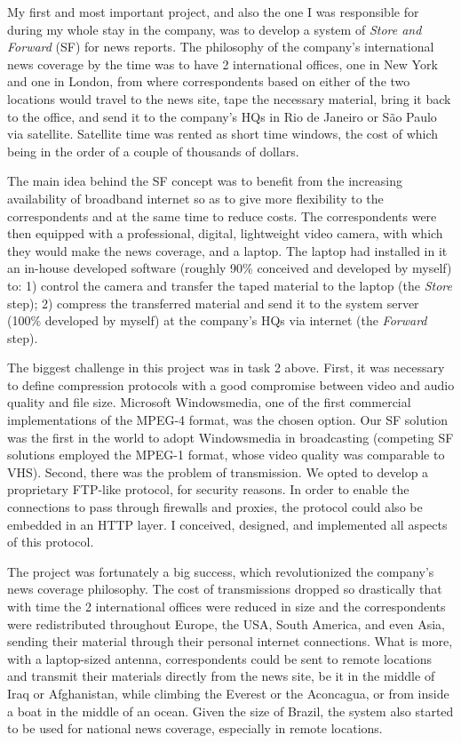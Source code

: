 \documentclass[a4paper]{article}
\begin{document}
My first and most important project, and also the one I was responsible for during my whole stay in the company, was to develop a system of {\em Store and Forward} (SF) for news reports. The philosophy of the company's international news coverage by the time was to have 2 international offices, one in New York and one in London, from where correspondents based on either of the two locations would travel to the news site, tape the necessary material, bring it back to the office, and send it to the company's HQs in Rio de Janeiro or S\~ao Paulo via satellite. Satellite time was rented as short time windows, the cost of which being in the order of a couple of thousands of dollars. 

The main idea behind the SF concept was to benefit from the increasing availability of broadband internet so as to give more flexibility to the correspondents and at the same time to reduce costs. The correspondents were then equipped with a professional, digital, lightweight video camera, with which they would make the news coverage, and a laptop. The laptop had installed in it an in-house developed software (roughly 90\% conceived and developed by myself) to: 1) control the camera and transfer the taped material to the laptop (the {\em Store} step); 2) compress the transferred material and send it to the system server (100\% developed by myself) at the company's HQs via internet (the {\em Forward} step). 

The biggest challenge in this project was in task 2 above. First, it was necessary to define compression protocols with a good compromise between video and audio quality and file size. Microsoft Windowsmedia, one of the first commercial implementations of the MPEG-4 format, was the chosen option. Our SF solution was the first in the world to adopt Windowsmedia in broadcasting (competing SF solutions employed the MPEG-1 format, whose video quality was comparable to VHS). Second, there was the problem of transmission. We opted to develop a proprietary FTP-like protocol, for security reasons. In order to enable the connections to pass through firewalls and proxies, the protocol could also be embedded in an HTTP layer. I conceived, designed, and implemented all aspects of this protocol. 

The project was fortunately a big success, which revolutionized the company's news coverage philosophy. The cost of transmissions dropped so drastically that with time the 2 international offices were reduced in size and the correspondents were redistributed throughout Europe, the USA, South America, and even Asia, sending their material through their personal internet connections. What is more, with a laptop-sized antenna, correspondents could be sent to remote locations and transmit their materials directly from the news site, be it in the middle of Iraq or Afghanistan, while climbing the Everest or the Aconcagua, or from inside a boat in the middle of an ocean. Given the size of Brazil, the system also started to be used for national news coverage, especially in remote locations. 
\end{document}
